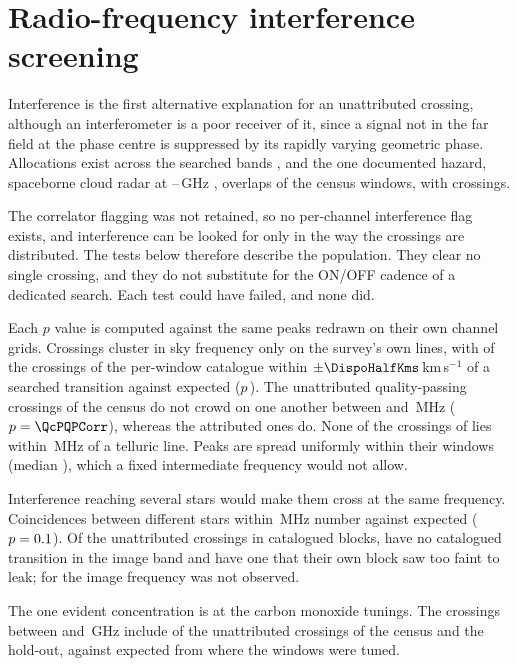 \section{Radio-frequency interference screening}
\label{app:rfi}

Interference is the first alternative explanation for an unattributed
crossing, although an interferometer is a poor receiver of it, since a
signal not in the far field at the phase centre is suppressed by its rapidly
varying geometric phase. Allocations exist across the searched bands
\citep{ITU2024}, and the one documented hazard, spaceborne cloud radar at
\RadarLo--\RadarHi\,GHz \citep{CloudSat2002,EarthCARE2023,ALMAMemo504},
overlaps \RadarNWin{} of the \RadarNTot{} census windows, with \RadarNCross{}
crossings.

The correlator flagging was not retained, so no per-channel interference
flag exists, and interference can be looked for only in the way the
crossings are distributed. The tests below therefore describe the
population. They clear no single crossing, and they do not substitute for
the ON/OFF cadence of a dedicated search. Each test could have failed, and
none did.

Each $p$ value is computed against the same peaks redrawn on their own
channel grids. Crossings cluster in sky frequency only
on the survey's own lines, with \AppMTubeObs{} of the \AppMNCrossF{} crossings of the per-window
catalogue within
$\pm\DispoHalfKms$\,km\,s$^{-1}$ of a searched transition against
\AppMTubeNull{} expected ($p$\,\AppMTubeP). The \QcNQP{} unattributed
quality-passing crossings of the census do not crowd on one another between \QcTolLo{} and
\QcTolHi\,MHz ($p=\QcPQPCorr$), whereas the attributed ones do. None of the
\TlNCross{} crossings of \TlCrossPop{} lies within \ScRadMHz\,MHz of a
telluric line. Peaks are spread uniformly within their windows (median
\RfiFracMed), which a fixed intermediate frequency would not allow.

Interference reaching several stars would make them cross at the same
frequency. Coincidences between different stars within \RfiOccTol\,MHz number
\RfiOccObs{} against \RfiOccNull{} expected ($p=0.1$). Of the
\ImNScreen{} unattributed crossings in catalogued blocks, \ImNNoParent{} have
no catalogued transition in the image band and \ImNParentAbsent{} have one that
their own block saw too faint to leak; for \ImNLeft{} the image frequency was not
observed.

The one evident concentration is at the carbon monoxide
tunings. The \TlBandAll{} crossings between \TlBandLo{} and \TlBandHi\,GHz
include \TlBandObs{} of the \TlBandNSub{} unattributed crossings of the
census and the hold-out, against \TlBandNull{} expected from where the
windows were tuned.
